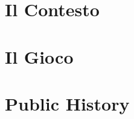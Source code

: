 \documentclass[12pt, twoside, openright]{memoir}
\begin{document}
\cleardoublepage
\tableofcontents

\part{Il Contesto}


\part{Il Gioco}







\part{Public History}


\appendix



\end{document}
